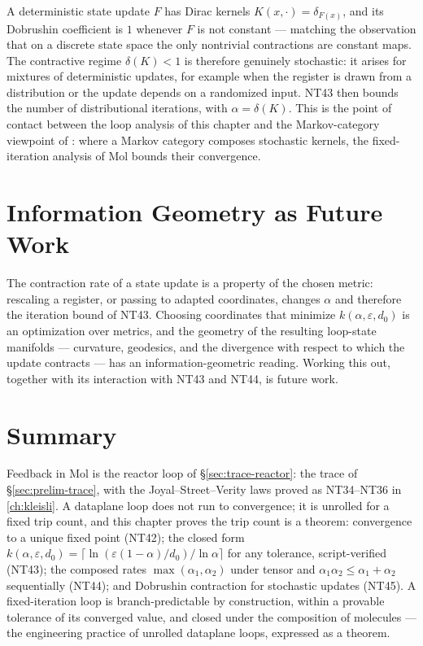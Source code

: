 \begin{remark}
A deterministic state update $F$ has Dirac kernels $K(x,\cdot) = \delta_{F(x)}$, and its Dobrushin coefficient is $1$ whenever $F$ is not constant --- matching the observation that on a discrete state space the only nontrivial contractions are constant maps. The contractive regime $\delta(K) < 1$ is therefore genuinely stochastic: it arises for mixtures of deterministic updates, for example when the register is drawn from a distribution or the update depends on a randomized input. NT43 then bounds the number of distributional iterations, with $\alpha = \delta(K)$. This is the point of contact between the loop analysis of this chapter and the Markov-category viewpoint of \citep{arxiv-markov-categories}: where a Markov category composes stochastic kernels, the fixed-iteration analysis of Mol bounds their convergence.
\end{remark}

\section{Information Geometry as Future Work}\label{sec:trace-geometry}

The contraction rate of a state update is a property of the chosen metric: rescaling a register, or passing to adapted coordinates, changes $\alpha$ and therefore the iteration bound of NT43. Choosing coordinates that minimize $k(\alpha,\varepsilon,d_0)$ is an optimization over metrics, and the geometry of the resulting loop-state manifolds --- curvature, geodesics, and the divergence with respect to which the update contracts --- has an information-geometric reading. Working this out, together with its interaction with NT43 and NT44, is future work.

\section{Summary}\label{sec:trace-summary}

Feedback in Mol is the reactor loop of \S\ref{sec:trace-reactor}: the trace of \S\ref{sec:prelim-trace}, with the Joyal--Street--Verity laws \citep{joyalsv} proved as NT34--NT36 in \autoref{ch:kleisli}. A dataplane loop does not run to convergence; it is unrolled for a fixed trip count, and this chapter proves the trip count is a theorem: convergence to a unique fixed point (NT42); the closed form $k(\alpha,\varepsilon,d_0) = \lceil \ln(\varepsilon(1-\alpha)/d_0)/\ln\alpha \rceil$ for any tolerance, script-verified (NT43); the composed rates $\max(\alpha_1,\alpha_2)$ under tensor and $\alpha_1\alpha_2 \leq \alpha_1+\alpha_2$ sequentially (NT44); and Dobrushin contraction for stochastic updates (NT45). A fixed-iteration loop is branch-predictable by construction, within a provable tolerance of its converged value, and closed under the composition of molecules --- the engineering practice of unrolled dataplane loops, expressed as a theorem.
